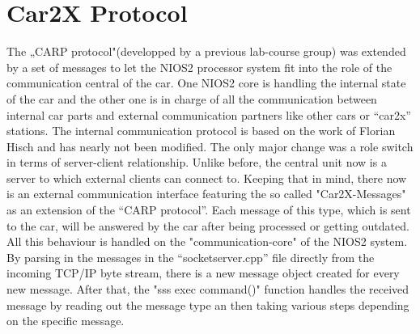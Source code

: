 \section{Car2X Protocol}
The „CARP protocol"(developped by a previous lab-course group) was extended by a set of messages to let the NIOS2 processor system fit into the role of the communication central of the car. One NIOS2 core is handling the internal state of the car and the other one is in charge of all the communication between internal car parts and external communication partners like other cars or “car2x” stations. \newline
The internal communication protocol is based on the work of Florian Hisch and has nearly not been modified. The only major change was a role switch in terms of server-client relationship. Unlike before, the central unit now is a server to which external clients can connect to.
Keeping that in mind, there now is an external communication interface featuring the so called "Car2X-Messages" as an extension of the “CARP protocol”. Each message of this type, which is sent to the car, will be answered by the car after being processed or getting outdated. 
\newline
All this behaviour is handled on the "communication-core" of the NIOS2 system.
By parsing in the messages in the “socketserver.cpp” file directly from the incoming TCP/IP byte stream, there is a new message object created for every new message.
After that, the "sss exec command()" function handles the received message by reading out the message type an then taking various steps depending on the specific message.


